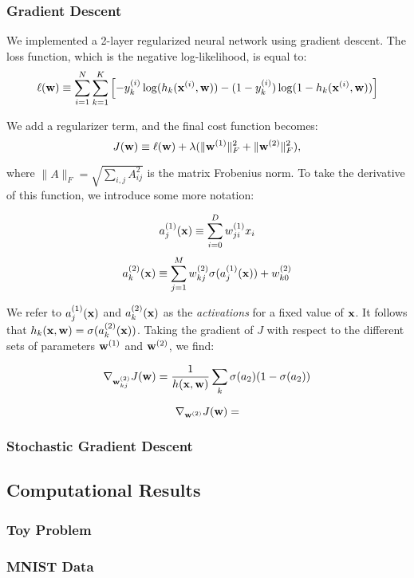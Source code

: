 \subsubsection{Gradient Descent}
We implemented a 2-layer regularized neural network using gradient descent.  The loss function, which is the negative log-likelihood, is equal to:
\begin{equation}
\ell(\boldsymbol{\mathbf{w}}) \equiv \sum_{i=1}^{N} \sum_{k=1}^{K} \left[ -y_k^{(i)} \log(h_{k}(\boldsymbol{\mathbf{x}}^{(i)}, \boldsymbol{\mathbf{w}})) - (1-y_k^{(i)}) \log(1 - h_{k}(\boldsymbol{\mathbf{x}}^{(i)}, \boldsymbol{\mathbf{w}}))\right]
\end{equation}

We add a regularizer term, and the final cost function becomes:
\begin{equation}
J(\boldsymbol{\mathbf{w}}) \equiv \ell(\boldsymbol{\mathbf{w}}) + \lambda(\|\boldsymbol{\mathbf{w}}^{(1)}\|^2_F + \|\boldsymbol{\mathbf{w}}^{(2)}\|^2_F),
\end{equation}

where $\|A\|_F = \sqrt{\sum_{i,j} A^2_{ij}}$ is the matrix Frobenius norm.  To take the derivative of this function, we introduce some more notation:

\begin{equation}
a^{(1)}_j(\boldsymbol{\mathbf{x}}) \equiv \sum_{i=0}^D w_{ji}^{(1)} x_i
\end{equation}
\begin{equation}
a^{(2)}_k(\boldsymbol{\mathbf{x}}) \equiv \sum_{j=1}^M w_{kj}^{(2)} \sigma(a^{(1)}_j(\boldsymbol{\mathbf{x}})) + w_{k0}^{(2)}
\end{equation}

We refer to $a^{(1)}_j(\boldsymbol{\mathbf{x}})$ and $a^{(2)}_k(\boldsymbol{\mathbf{x}})$ as the \emph{activations} for a fixed value of $\boldsymbol{\mathbf{x}}$.  It follows that $h_{k}(\boldsymbol{\mathbf{x}},\boldsymbol{\mathbf{w}}) = \sigma(a^{(2)}_k(\boldsymbol{\mathbf{x}}))$.  Taking the gradient of $J$ with respect to the different sets of parameters $\boldsymbol{\mathbf{w}}^{(1)}$ and $\boldsymbol{\mathbf{w}}^{(2)}$, we find:  

\begin{equation}
\nabla_{\boldsymbol{\mathbf{w}}^{(2)}_{kj}} J(\boldsymbol{\mathbf{w}}) = \frac{1}{h(\boldsymbol{\mathbf{x}},\boldsymbol{\mathbf{w}})}\sum_k \sigma(a_2) (1 - \sigma(a_2))
\end{equation}

\begin{equation}
\nabla_{\boldsymbol{\mathbf{w}}^{(2)}} J(\boldsymbol{\mathbf{w}}) = 
\end{equation}

\subsubsection{Stochastic Gradient Descent}



\subsection{Computational Results}

\subsubsection{Toy Problem}

\subsubsection{MNIST Data}



